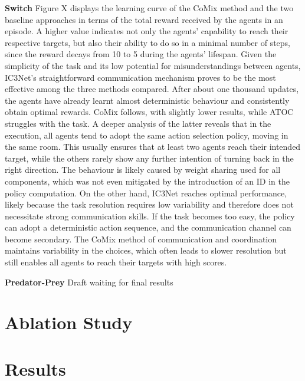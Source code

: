 \documentclass[a4paper,singleside,12pt]{report} %
\begin{document}
\textbf{Switch} Figure X displays the learning curve of the CoMix method and the two baseline approaches in terms of the total reward received by the agents in an episode. A higher value indicates not only the agents' capability to reach their respective targets, but also their ability to do so in a minimal number of steps, since the reward decays from 10 to 5 during the agents' lifespan.
Given the simplicity of the task and its low potential for misunderstandings between agents, IC3Net's straightforward communication mechanism proves to be the most effective among the three methods compared. After about one thousand updates, the agents have already learnt almost deterministic behaviour and consistently obtain optimal rewards. CoMix follows, with slightly lower results, while ATOC struggles with the task. A deeper analysis of the latter reveals that in the execution, all agents tend to adopt the same action selection policy, moving in the same room. This usually ensures that at least two agents reach their intended target, while the others rarely show any further intention of turning back in the right direction. The behaviour is likely caused by weight sharing used for all components, which was not even mitigated by the introduction of an ID in the policy computation. On the other hand, IC3Net reaches optimal performance, likely because the task resolution requires low variability and therefore does not necessitate strong communication skills. If the task becomes too easy, the policy can adopt a deterministic action sequence, and the communication channel can become secondary. The CoMix method of communication and coordination maintains variability in the choices, which often leads to slower resolution but still enables all agents to reach their targets with high scores.

\textbf{Predator-Prey} 
Draft waiting for final results


\section{Ablation Study}\label{ablation}

\section{Results}\label{results}
\end{document}
